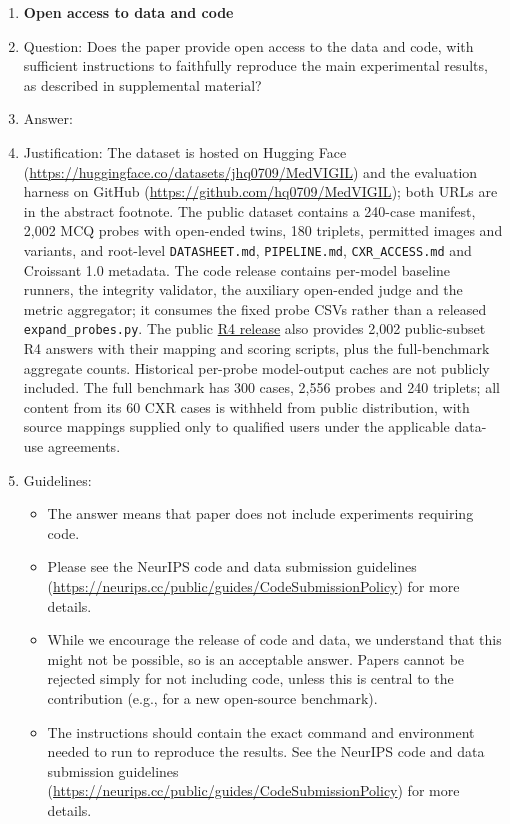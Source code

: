 \begin{enumerate}
\item {\bf Open access to data and code}
    \item[] Question: Does the paper provide open access to the data and code, with sufficient instructions to faithfully reproduce the main experimental results, as described in supplemental material?
    \item[] Answer: \answerYes{}
    \item[] Justification: The dataset is hosted on Hugging Face (\url{https://huggingface.co/datasets/jhq0709/MedVIGIL}) and the evaluation harness on GitHub (\url{https://github.com/hq0709/MedVIGIL}); both URLs are in the abstract footnote. The public dataset contains a 240-case manifest, 2,002 MCQ probes with open-ended twins, 180 triplets, permitted images and variants, and root-level \texttt{DATASHEET.md}, \texttt{PIPELINE.md}, \texttt{CXR\_ACCESS.md} and Croissant 1.0 metadata. The code release contains per-model baseline runners, the integrity validator, the auxiliary open-ended judge and the metric aggregator; it consumes the fixed probe CSVs rather than a released \texttt{expand\_probes.py}. The public \href{https://github.com/JunhaoChenMichael/MedVIGIL/tree/ad805039ef9ae0eb406b23fd321d8a176da47c73/data/r4_public}{R4 release} also provides 2,002 public-subset R4 answers with their mapping and scoring scripts, plus the full-benchmark aggregate counts. Historical per-probe model-output caches are not publicly included. The full benchmark has 300 cases, 2,556 probes and 240 triplets; all content from its 60 CXR cases is withheld from public distribution, with source mappings supplied only to qualified users under the applicable data-use agreements.
    \item[] Guidelines:
    \begin{itemize}
        \item The answer \answerNA{} means that paper does not include experiments requiring code.
        \item Please see the NeurIPS code and data submission guidelines (\url{https://neurips.cc/public/guides/CodeSubmissionPolicy}) for more details.
        \item While we encourage the release of code and data, we understand that this might not be possible, so \answerNo{} is an acceptable answer. Papers cannot be rejected simply for not including code, unless this is central to the contribution (e.g., for a new open-source benchmark).
        \item The instructions should contain the exact command and environment needed to run to reproduce the results. See the NeurIPS code and data submission guidelines (\url{https://neurips.cc/public/guides/CodeSubmissionPolicy}) for more details.

\end{itemize}
\end{enumerate}
